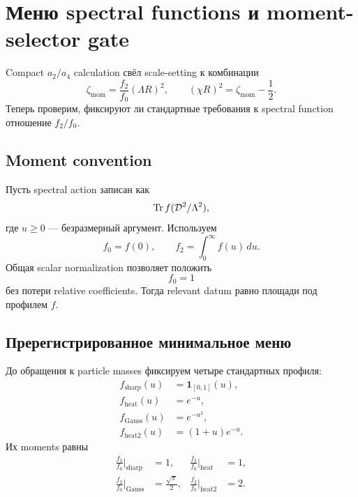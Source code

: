 \chapter{Меню spectral functions и moment-selector gate}

Compact \(a_2/a_4\) calculation свёл scale-setting к комбинации
\begin{equation}
 \zeta_{\mathrm{mom}}
 =
 \frac{f_2}{f_0}(\Lambda R)^2,
 \qquad
 (\chi R)^2=\zeta_{\mathrm{mom}}-\frac12.
\end{equation}
Теперь проверим, фиксируют ли стандартные требования к spectral function
отношение \(f_2/f_0\).

\section{Moment convention}

Пусть spectral action записан как
\begin{equation}
 \operatorname{Tr} f(\mathcal D^2/\Lambda^2),
\end{equation}
где \(u\ge0\) --- безразмерный аргумент. Используем
\begin{equation}
 f_0=f(0),
 \qquad
 f_2=\int_0^\infty f(u)\,du.
\end{equation}
Общая scalar normalization позволяет положить
\begin{equation}
 f_0=1
\end{equation}
без потери relative coefficients. Тогда relevant datum равно площади под
профилем \(f\).

\section{Пререгистрированное минимальное меню}

До обращения к particle masses фиксируем четыре стандартных профиля:
\begin{align}
 f_{\mathrm{sharp}}(u)
 &=\mathbf1_{[0,1]}(u),
 \\
 f_{\mathrm{heat}}(u)
 &=e^{-u},
 \\
 f_{\mathrm{Gauss}}(u)
 &=e^{-u^2},
 \\
 f_{\mathrm{heat2}}(u)
 &=(1+u)e^{-u}.
\end{align}
Их moments равны
\begin{align}
 \frac{f_2}{f_0}\bigg|_{\mathrm{sharp}}
 &=1,
 &
 \frac{f_2}{f_0}\bigg|_{\mathrm{heat}}
 &=1,
 \\
 \frac{f_2}{f_0}\bigg|_{\mathrm{Gauss}}
 &=\frac{\sqrt\pi}{2},
 &
 \frac{f_2}{f_0}\bigg|_{\mathrm{heat2}}
 &=2.
\end{align}

